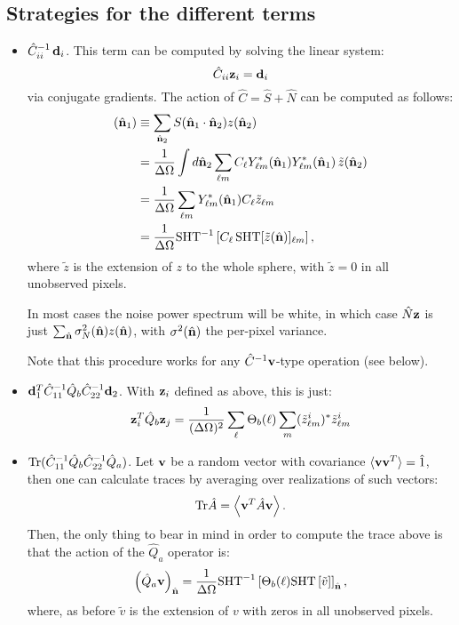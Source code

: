 \documentclass[a4paper,10pt]{article}
\newcommand{\Tr}{{\rm Tr}}
\newcommand{\nv}{\hat{\bf n}}
\begin{document}
\subsection{Strategies for the different terms}
\begin{itemize}
\item $\hat{C}^{-1}_{ii}\,{\bf d}_i$. This term can be computed by solving the
linear system:
\begin{equation}
  \hat{C}_{ii}{\bf z}_i={\bf d}_i
\end{equation}
via conjugate gradients. The action of $\hat{C}=\hat{S}+\hat{N}$ can be computed as
follows:
\begin{align}
 [\hat{S}{\bf z}](\nv_1)&\equiv\sum_{\nv_2}S(\nv_1\cdot\nv_2)z(\nv_2)\\
                        &=\frac{1}{\Delta\Omega}\int d\nv_2\sum_{\ell m}C_\ell
                          Y^*_{\ell m}(\nv_1)Y^*_{\ell m}(\nv_1)\,\tilde{z}(\nv_2)\\
                        &=\frac{1}{\Delta\Omega}\sum_{\ell m} Y^*_{\ell m}(\nv_1)
                        C_\ell \tilde{z}_{\ell m}\\
                        &=\frac{1}{\Delta\Omega}
{\rm SHT}^{-1}\left[C_\ell\,{\rm SHT}[\tilde{z}(\nv)]_{\ell m}\right],
\end{align}
where $\tilde{z}$ is the extension of $z$ to the whole sphere, with $\tilde{z}=0$ in
all unobserved pixels.

In most cases the noise power spectrum will be white, in which case $\hat{N}{\bf z}$
is just $\sum_{\nv}\sigma_N^2(\nv)z(\nv)$, with $\sigma^2(\nv)$ the per-pixel
variance.

Note that this procedure works for any $\hat{C}^{-1}{\bf v}$-type operation
(see below).


\item ${\bf d}^T_1\hat{C}^{-1}_{11}\hat{Q}_b\hat{C}^{-1}_{22}{\bf d}_2$. With
${\bf z}_i$ defined as above, this is just:
\begin{align}
 {\bf z}^T_i\hat{Q}_b{\bf z}_j=
 \frac{1}{(\Delta\Omega)^2}\sum_\ell\Theta_b(\ell)
 \sum_m(\tilde{z}^{i}_{\ell m})^*\tilde{z}^{i}_{\ell m}
\end{align}
\item $\Tr(\hat{C}^{-1}_{11}\hat{Q}_b\hat{C}^{-1}_{22}\hat{Q}_a)$. Let ${\bf v}$ be a random
vector with covariance $\langle {\bf v}{\bf v}^T\rangle=\hat{1}$, then one can
calculate traces by averaging over realizations of such
vectors:
 \begin{equation}
   \Tr{\hat{A}}=\left\langle {\bf v}^T\hat{A}{\bf v}\right\rangle.
 \end{equation}
 Then, the only thing to bear in mind in order to compute the trace above is that the action of the
 $\hat{Q}_a$ operator is:
 \begin{equation}
   \left(\hat{Q}_a{\bf v}\right)_{\nv}=\frac{1}{\Delta\Omega}{\rm SHT}^{-1}
   \left[\Theta_b(\ell){\rm SHT}\left[\tilde{v}\right]\right]_{\nv},
 \end{equation}
 where, as before $\tilde{v}$ is the extension of $v$ with zeros in all unobserved pixels.


\end{itemize}
\end{document}
